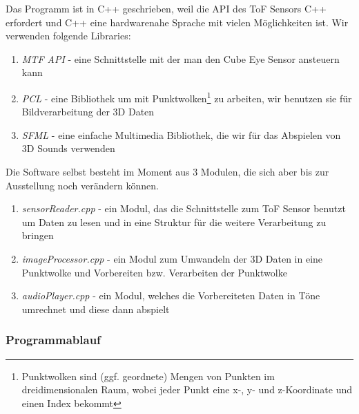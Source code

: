 \documentclass[a4paper,12pt,ngerman]{scrartcl}
\begin{document}
Das Programm ist in C++ geschrieben, weil die API des ToF Sensors C++ erfordert und C++ eine hardwarenahe
Sprache mit vielen Möglichkeiten ist. Wir verwenden folgende Libraries:
\begin{enumerate}
	\item \textit{MTF API} - eine Schnittstelle mit der man den Cube Eye Sensor ansteuern kann
	\item \textit{PCL} - eine Bibliothek um mit Punktwolken\footnote{Punktwolken sind (ggf. geordnete) Mengen von Punkten im dreidimensionalen Raum, 
		wobei jeder Punkt eine x-, y- und z-Koordinate und einen Index bekommt} zu arbeiten, wir benutzen 
	sie für Bildverarbeitung der 3D Daten
	\item \textit{SFML} - eine einfache Multimedia Bibliothek, 
	die wir für das Abspielen von 3D Sounds verwenden 
\end{enumerate} 
Die Software selbst besteht im Moment aus 3 Modulen, die sich aber bis zur Ausstellung noch verändern 
können.
\begin{enumerate}
	\item \textit{sensorReader.cpp} - ein Modul, das die Schnittstelle zum ToF Sensor benutzt um Daten zu 
	lesen und in eine Struktur für die weitere Verarbeitung zu bringen
	\item \textit{imageProcessor.cpp} - ein Modul zum Umwandeln der 3D Daten in eine Punktwolke und 
	Vorbereiten bzw. Verarbeiten der Punktwolke
	\item \textit{audioPlayer.cpp} - ein Modul, welches die Vorbereiteten Daten in Töne umrechnet und 
	diese dann abspielt
\end{enumerate}

\subsubsection{Programmablauf}
\end{document}
